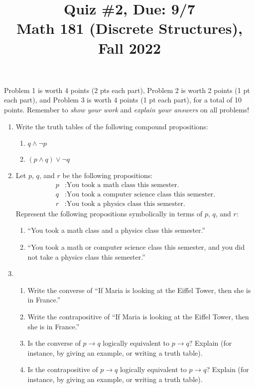 \documentclass[11pt]{article}
\title{Quiz \#2, Due: 9/7 \\Math 181 (Discrete Structures), Fall 2022}
\date{}
\begin{document}
\maketitle

\thispagestyle{empty}

\vspace{-1cm}

Problem 1 is worth 4 points (2 pts each part), Problem 2 is worth 2 points (1 pt each part), and Problem 3 is worth 4 points (1 pt each part), for a total of 10 points. Remember to \emph{show your work} and \emph{explain your answers} on all problems!

\begin{enumerate}
\item Write the truth tables of the following compound propositions:
\begin{enumerate}
\item $q \wedge \neg p$
\item $(p \wedge q) \vee \neg q$
\end{enumerate}

\item Let $p$, $q$, and $r$ be the following propositions:
\begin{align*}
p &: \textrm{You took a math class this semester.} \\
q &: \textrm{You took a computer science class this semester.} \\
r &: \textrm{You took a physics class this semester.}
\end{align*}
Represent the following propositions symbolically in terms of $p$, $q$, and $r$:
\begin{enumerate}
\item ``You took a math class and a physics class this semester.''
\item ``You took a math or computer science class this semester, and you did not take a physics class this semester.''
\end{enumerate}

\item \begin{enumerate}
\item Write the converse of ``If Maria is looking at the Eiffel Tower, then she is in France.''
\item Write the contrapositive of ``If Maria is looking at the Eiffel Tower, then she is in France.''
\item Is the converse of $p \to q$ logically equivalent to $p \to q$? Explain (for instance, by giving an example, or writing a truth table).
\item Is the contrapositive of $p \to q$ logically equivalent to $p \to q$? Explain (for instance, by giving an example, or writing a truth table).
\end{enumerate}
\end{enumerate}
\end{document}
